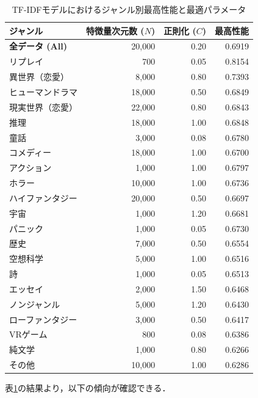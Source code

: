 \documentclass[uplatex, dvipdfmx, 11pt, a4paper, report]{jsbook}
\begin{document}
\begin{table}[H]
  \centering
  \caption{TF-IDFモデルにおけるジャンル別最高性能と最適パラメータ}
  \label{tab:tfidf_summary}
  \begin{tabular}{lrrr} \hline
    ジャンル & 特徴量次元数 ($N$) & 正則化 ($C$) & 最高性能 \\ \hline
    \textbf{全データ (All)} & 20,000 & 0.20 & 0.6919 \\ \hline
    リプレイ & 700 & 0.05 & 0.8154 \\
    異世界（恋愛） & 8,000 & 0.80 & 0.7393 \\
    ヒューマンドラマ & 18,000 & 0.50 & 0.6849 \\
    現実世界（恋愛） & 22,000 & 0.80 & 0.6843 \\
    推理 & 18,000 & 1.00 & 0.6848 \\
    童話 & 3,000 & 0.08 & 0.6780 \\
    コメディー & 18,000 & 1.00 & 0.6700 \\
    アクション & 1,000 & 1.00 & 0.6797 \\
    ホラー & 10,000 & 1.00 & 0.6736 \\
    ハイファンタジー & 20,000 & 0.50 & 0.6697 \\
    宇宙 & 1,000 & 1.20 & 0.6681 \\
    パニック & 1,000 & 0.05 & 0.6730 \\
    歴史 & 7,000 & 0.50 & 0.6554 \\
    空想科学 & 5,000 & 1.00 & 0.6516 \\
    詩 & 1,000 & 0.05 & 0.6513 \\
    エッセイ & 2,000 & 1.50 & 0.6468 \\
    ノンジャンル & 5,000 & 1.20 & 0.6430 \\
    ローファンタジー & 3,000 & 0.50 & 0.6417 \\
    VRゲーム & 800 & 0.08 & 0.6386 \\
    純文学 & 1,000 & 0.80 & 0.6266 \\
    その他 & 10,000 & 1.00 & 0.6286 \\ \hline
  \end{tabular}
\end{table}

表\ref{tab:tfidf_summary}の結果より，以下の傾向が確認できる．
\end{document}
